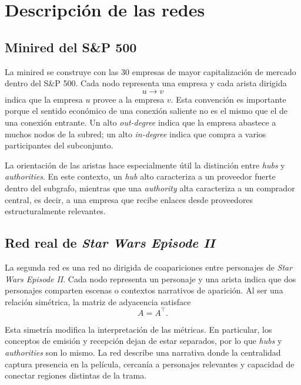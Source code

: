 \section{Descripción de las redes}

\subsection{Minired del S\&P 500}

La minired se construye con las 30 empresas de mayor capitalización de mercado dentro del S\&P 500. Cada nodo representa una empresa y cada arista dirigida
\[
 u\to v
\]
indica que la empresa $u$ provee a la empresa $v$. Esta convención es importante porque el sentido económico de una conexión saliente no es el mismo que el de una conexión entrante. Un alto \textit{out-degree} indica que la empresa abastece a muchos nodos de la subred; un alto \textit{in-degree} indica que compra a varios participantes del subconjunto.

La orientación de las aristas hace especialmente útil la distinción entre \textit{hubs} y \textit{authorities}. En este contexto, un \textit{hub} alto caracteriza a un proveedor fuerte dentro del subgrafo, mientras que una \textit{authority} alta caracteriza a un comprador central, es decir, a una empresa que recibe enlaces desde proveedores estructuralmente relevantes.

\subsection{Red real de \textit{Star Wars Episode II}}

La segunda red es una red no dirigida de coapariciones entre personajes de \textit{Star Wars Episode II}. Cada nodo representa un personaje y una arista indica que dos personajes comparten escenas o contextos narrativos de aparición. Al ser una relación simétrica, la matriz de adyacencia satisface
\[
A=A^{\top}.
\]

Esta simetría modifica la interpretación de las métricas. En particular, los conceptos de emisión y recepción dejan de estar separados, por lo que \textit{hubs} y \textit{authorities} son lo mismo. La red describe una narrativa donde la centralidad captura presencia en la película, cercanía a personajes relevantes y capacidad de conectar regiones distintas de la trama.
